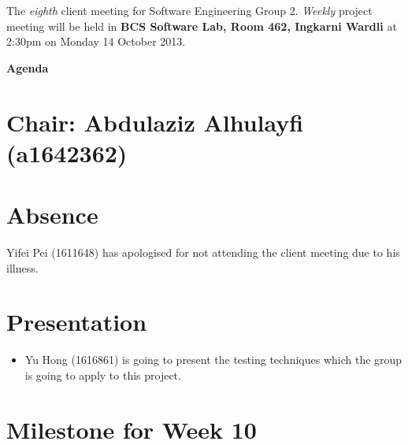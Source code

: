 \documentclass[11pt, a4paper]{article}
\begin{document}
\noindent The {\em eighth} client meeting for Software Engineering Group 2. {\em Weekly} project meeting will be held in {\bf BCS Software Lab, Room 462, Ingkarni Wardli} \textnormal{at} 2:30pm  \textnormal{on} Monday 14 October 2013.


\vspace*{15pt}

\begin{center}
\huge \bf Agenda
\end{center}



\section*{Chair: Abdulaziz Alhulayfi \large (a1642362)}

\vspace*{15pt}

\section{Absence}

Yifei Pei (1611648) has apologised for not attending the client meeting due to his illness.


\section{Presentation}

\begin {itemize}
\item  Yu Hong (1616861) is going to present the testing techniques which the group is going to apply to this project.
\end {itemize}

\section{Milestone for Week 10}
\end{document}
